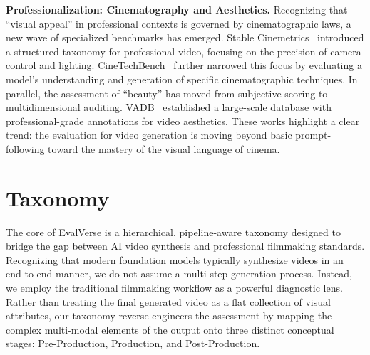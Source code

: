 \documentclass{article}
\begin{document}
\noindent
\textbf{Professionalization: Cinematography and Aesthetics.} Recognizing that ``visual appeal'' in professional contexts is governed by cinematographic laws, a new wave of specialized benchmarks has emerged. Stable Cinemetrics~\cite{stable_cinemetrics} introduced a structured taxonomy for professional video, focusing on the precision of camera control and lighting. CineTechBench~\cite{cinetechbench} further narrowed this focus by evaluating a model's understanding and generation of specific cinematographic techniques. In parallel, the assessment of ``beauty'' has moved from subjective scoring to multidimensional auditing. VADB~\cite{vadb} established a large-scale database with professional-grade annotations for video aesthetics. These works highlight a clear trend: the evaluation for video generation is moving beyond basic prompt-following toward the mastery of the visual language of cinema.




\section{Taxonomy}

The core of EvalVerse is a hierarchical, pipeline-aware taxonomy designed to bridge the gap between AI video synthesis and professional filmmaking standards. Recognizing that modern foundation models typically synthesize videos in an end-to-end manner, we do not assume a multi-step generation process. Instead, we employ the traditional filmmaking workflow as a powerful diagnostic lens. Rather than treating the final generated video as a flat collection of visual attributes, our taxonomy reverse-engineers the assessment by mapping the complex multi-modal elements of the output onto three distinct conceptual stages: Pre-Production, Production, and Post-Production.
\end{document}
